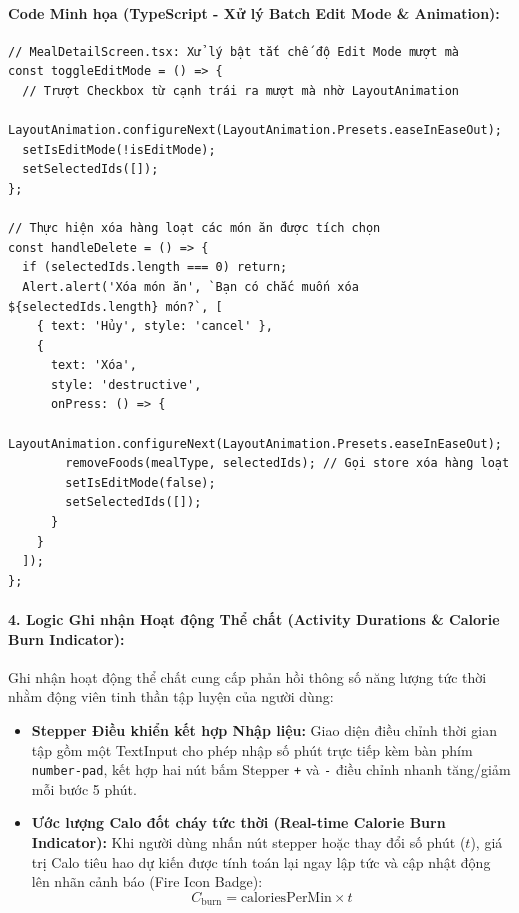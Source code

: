 \documentclass[12pt,a4paper]{article}
\begin{document}
\paragraph{Code Minh họa (TypeScript - Xử lý Batch Edit Mode \& Animation):}
\begin{verbatim}
// MealDetailScreen.tsx: Xử lý bật tắt chế độ Edit Mode mượt mà
const toggleEditMode = () => {
  // Trượt Checkbox từ cạnh trái ra mượt mà nhờ LayoutAnimation
  LayoutAnimation.configureNext(LayoutAnimation.Presets.easeInEaseOut);
  setIsEditMode(!isEditMode);
  setSelectedIds([]);
};

// Thực hiện xóa hàng loạt các món ăn được tích chọn
const handleDelete = () => {
  if (selectedIds.length === 0) return;
  Alert.alert('Xóa món ăn', `Bạn có chắc muốn xóa ${selectedIds.length} món?`, [
    { text: 'Hủy', style: 'cancel' },
    { 
      text: 'Xóa', 
      style: 'destructive', 
      onPress: () => {
        LayoutAnimation.configureNext(LayoutAnimation.Presets.easeInEaseOut);
        removeFoods(mealType, selectedIds); // Gọi store xóa hàng loạt
        setIsEditMode(false);
        setSelectedIds([]);
      } 
    }
  ]);
};
\end{verbatim}

\paragraph{4. Logic Ghi nhận Hoạt động Thể chất (Activity Durations \& Calorie Burn Indicator):}
Ghi nhận hoạt động thể chất cung cấp phản hồi thông số năng lượng tức thời nhằm động viên tinh thần tập luyện của người dùng:
\begin{itemize}
    \item \textbf{Stepper Điều khiển kết hợp Nhập liệu:} Giao diện điều chỉnh thời gian tập gồm một TextInput cho phép nhập số phút trực tiếp kèm bàn phím \texttt{number-pad}, kết hợp hai nút bấm Stepper \texttt{+} và \texttt{-} điều chỉnh nhanh tăng/giảm mỗi bước 5 phút.
    \item \textbf{Ước lượng Calo đốt cháy tức thời (Real-time Calorie Burn Indicator):} Khi người dùng nhấn nút stepper hoặc thay đổi số phút ($t$), giá trị Calo tiêu hao dự kiến được tính toán lại ngay lập tức và cập nhật động lên nhãn cảnh báo (Fire Icon Badge):
    \begin{equation}
        C_{\text{burn}} = \text{caloriesPerMin} \times t
    \end{equation}
\end{itemize}
\end{document}
